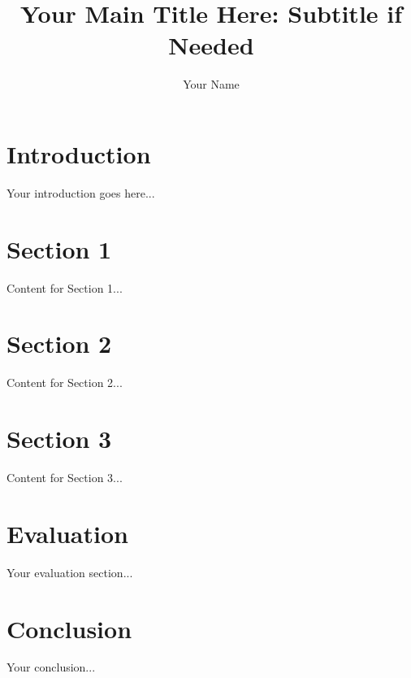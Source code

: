 \documentclass[12pt, letterpaper]{article}
\title{Your Main Title Here: Subtitle if Needed}
\author{Your Name}
\date{}
\begin{document}
\maketitle

\doublespacing

\section{Introduction}

Your introduction goes here...

\section{Section 1}

Content for Section 1...

\section{Section 2}

Content for Section 2...

\section{Section 3}

Content for Section 3...

\section{Evaluation}

Your evaluation section...

\section{Conclusion}

Your conclusion...
\end{document}
